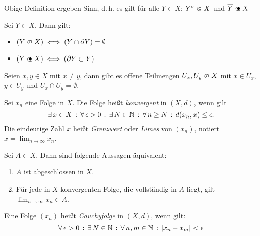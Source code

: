 \documentclass{cheat-sheet}
\begin{document}
\begin{satz}
Obige Definition ergeben Sinn, d.\,h. es gilt für alle $Y \subset X$: $Y^{\circ} \opn X$ und $\overline{Y} \cls X$
\end{satz}


\begin{satz}
Sei $Y \subset X$. Dann gilt:
\begin{multicols}{2}
  \begin{itemize}
    \item $(Y \opn X) \iff (Y \cap \partial Y) = \emptyset$
    \item $(Y \cls X) \iff (\partial Y \subset Y)$
  \end{itemize}
\end{multicols}
\end{satz}

\begin{satz}
Seien $x, y \in X$ mit $x \not= y$, dann gibt es offene Teilmengen $U_x, U_y \opn X$ mit $x \in U_x$, $y \in U_y$ und $U_x \cap U_y = \emptyset$.
\end{satz}

\begin{defn}
Sei $x_n$ eine Folge in $X$. Die Folge heißt \emph{konvergent} in $(X, d)$, wenn gilt
\[ \exists \, {x \in X} \,:\, \forall \, {\epsilon > 0} \,:\, \exists \, {N \in \mathbb{N}} \,:\, \forall \, {n \ge N} \,:\, d(x_n, x) \le \epsilon. \]
Die eindeutige Zahl $x$ heißt \emph{Grenzwert} oder \emph{Limes} von $(x_n)$, notiert $x = \lim_{n \to \infty} x_n$.
\end{defn}

\begin{satz}
Sei $A \subset X$. Dann sind folgende Aussagen äquivalent:
\begin{enumerate}
  \item $A$ ist abgeschlossen in $X$.
  \item Für jede in $X$ konvergenten Folge, die vollständig in $A$ liegt, gilt $\lim_{n \to \infty} x_n \in A$.
\end{enumerate}
\end{satz}

\begin{defn}
Eine Folge $(x_n)$ heißt \emph{Cauchyfolge} in $(X, d)$, wenn gilt:
\[ \forall \, {\epsilon > 0} \,:\, \exists \, {N \in \mathbb{N}} \,:\, \forall \, {n, m \in \mathbb{N}} \,:\, \lvert x_n - x_m\rvert < \epsilon \]
\end{defn}
\end{document}
